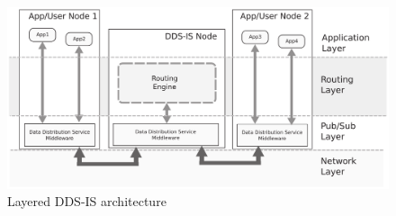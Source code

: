 \begin{figure}[H]
	\centering
	\includegraphics[scale=0.18]{middleware/DDSISarchitecture.png}
	\caption{Layered DDS-IS architecture}
	\label{fig:DDSISarchitecture}
\end{figure}
